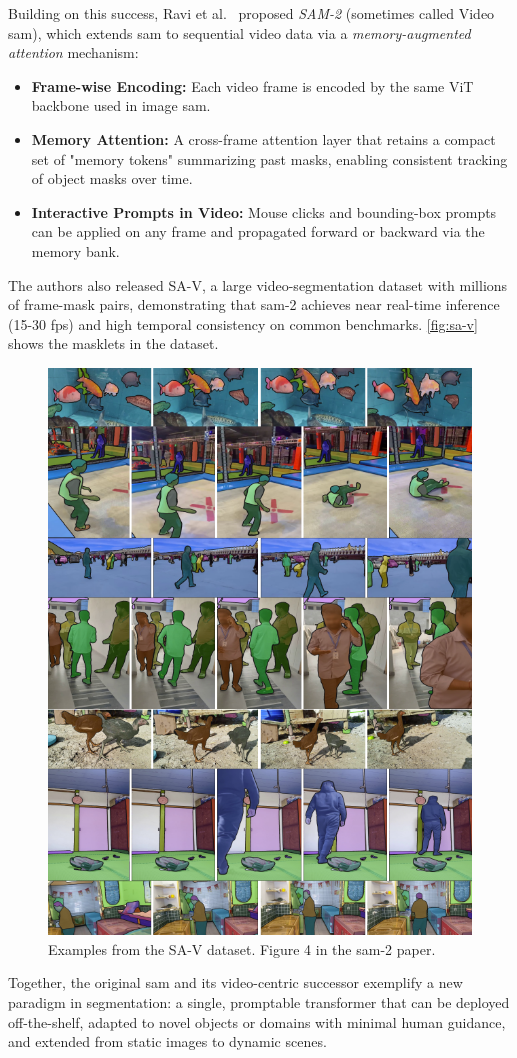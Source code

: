 Building on this success, Ravi et al.\ \cite{ravi_sam_nodate} proposed \emph{SAM-2} (sometimes called Video \acrshort{sam}), which extends \acrshort{sam} to sequential video data via a \emph{memory-augmented attention} mechanism:
\begin{itemize}
    \item \textbf{Frame-wise Encoding:} Each video frame is encoded by the same ViT backbone used in image \acrshort{sam}.
    \item \textbf{Memory Attention:} A cross-frame attention layer that retains a compact set of "memory tokens" summarizing past masks, enabling consistent tracking of object masks over time.
    \item \textbf{Interactive Prompts in Video:} Mouse clicks and bounding-box prompts can be applied on any frame and propagated forward or backward via the memory bank.
\end{itemize}
The authors also released SA-V, a large video-segmentation dataset with millions of frame-mask pairs, demonstrating that \acrshort{sam}-2 achieves near real-time inference (15-30 fps) and high temporal consistency on common benchmarks. \autoref{fig:sa-v} shows the masklets in the dataset. 
\begin{figure}
    \centering
    \includegraphics[width=0.5\linewidth]{figures/sam_2.png}
    \caption{Examples from the SA-V dataset. Figure 4 in the \acrshort{sam}-2 paper\cite{ravi_sam_nodate}.}
    \label{fig:sa-v}
\end{figure}

Together, the original \acrshort{sam} and its video-centric successor exemplify a new paradigm in segmentation: a single, promptable transformer that can be deployed off-the-shelf, adapted to novel objects or domains with minimal human guidance, and extended from static images to dynamic scenes. 

